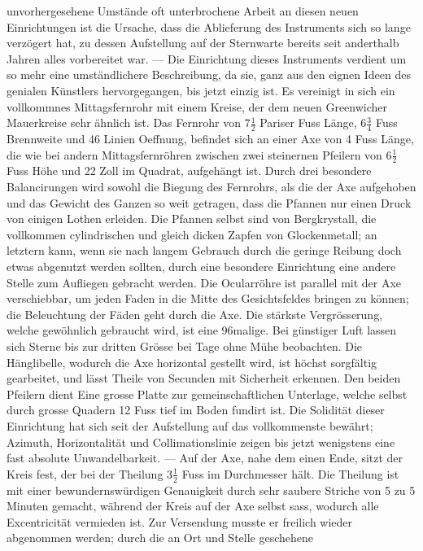 unvorhergesehene Umstände oft unterbrochene Arbeit an diesen neuen Einrichtungen ist die Ursache, dass die Ablieferung des Instruments sich so lange verzögert hat, zu dessen Aufstellung auf der Sternwarte bereits seit anderthalb Jahren alles vorbereitet war. --- Die Einrichtung dieses Instruments verdient um so mehr eine umständlichere Beschreibung, da sie, ganz aus den eignen Ideen des genialen Künstlers hervorgegangen, bis jetzt einzig ist. Es vereinigt in sich ein vollkommnes Mittagsfernrohr mit einem Kreise, der dem neuen Greenwicher Mauerkreise sehr ähnlich ist. Das Fernrohr von $7\frac{1}{2}$ Pariser Fuss Länge, $6\frac{3}{4}$ Fuss Brennweite und 46 Linien Oeffnung, befindet sich an einer Axe von 4 Fuss Länge, die wie bei andern Mittagsfernröhren zwischen zwei steinernen Pfeilern von $6\frac{1}{2}$ Fuss Höhe und 22 Zoll im Quadrat, aufgehängt ist. Durch drei besondere Balancirungen wird sowohl die Biegung des Fernrohrs, als die der Axe aufgehoben und das Gewicht des Ganzen so weit getragen, dass die Pfannen nur einen Druck von einigen Lothen erleiden. Die Pfannen  selbst sind von Bergkrystall, die vollkommen cylindrischen und gleich dicken Zapfen von
Glockenmetall; an letztern kann, wenn sie nach langem Gebrauch durch die geringe Reibung doch etwas
abgenutzt werden sollten, durch eine besondere Einrichtung eine andere Stelle zum Aufliegen gebracht
werden. Die Ocularröhre ist parallel mit der Axe verschiebbar, um jeden Faden in die Mitte des
Gesichtsfeldes bringen zu können; die Beleuchtung der Fäden geht durch die Axe. Die stärkste
Vergrösserung, welche gewöhnlich gebraucht wird, ist eine 96malige. Bei günstiger Luft lassen sich
Sterne bis zur dritten Grösse bei Tage ohne Mühe beobachten. Die Hänglibelle, wodurch die Axe
horizontal gestellt wird, ist höchst sorgfältig gearbeitet, und lässt Theile von Secunden mit
Sicherheit erkennen. Den beiden Pfeilern dient Eine grosse Platte zur gemeinschaftlichen Unterlage,
welche selbst durch grosse Quadern 12 Fuss tief im Boden fundirt ist. Die Solidität dieser Einrichtung
hat sich seit der Aufstellung auf das vollkommenste bewährt; Azimuth, Horizontalität und
Collimationslinie zeigen bis jetzt wenigstens eine fast absolute Unwandelbarkeit. --- Auf der Axe,
nahe dem einen Ende, sitzt der Kreis fest, der bei der Theilung $3\frac{1}{2}$ Fuss im Durchmesser hält.
Die Theilung ist mit einer bewundernswürdigen Genauigkeit durch sehr saubere Striche von 5 zu 5
Minuten gemacht, während der Kreis auf der Axe selbst sass, wodurch alle Excentricität vermieden ist.
Zur Versendung musste er freilich wieder abgenommen werden; durch die an Ort und Stelle geschehene
